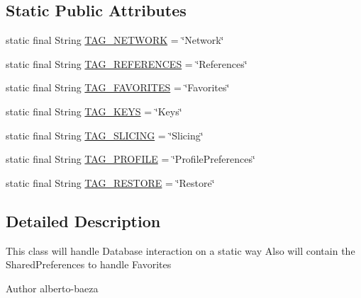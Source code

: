 \subsection*{Static Public Attributes}
\begin{DoxyCompactItemize}
\item 
static final String \hyperlink{classandroid_1_1app_1_1printerapp_1_1devices_1_1database_1_1_database_controller_ad0405374d5ebedd9bdb926c448a8109c}{T\+A\+G\+\_\+\+N\+E\+T\+W\+O\+RK} = \char`\"{}Network\char`\"{}
\item 
static final String \hyperlink{classandroid_1_1app_1_1printerapp_1_1devices_1_1database_1_1_database_controller_a6d815a2fefd8e35552ed4c3becba7a0b}{T\+A\+G\+\_\+\+R\+E\+F\+E\+R\+E\+N\+C\+ES} = \char`\"{}References\char`\"{}
\item 
static final String \hyperlink{classandroid_1_1app_1_1printerapp_1_1devices_1_1database_1_1_database_controller_a7006720e05920a2f9315c0ff0edbf1e3}{T\+A\+G\+\_\+\+F\+A\+V\+O\+R\+I\+T\+ES} = \char`\"{}Favorites\char`\"{}
\item 
static final String \hyperlink{classandroid_1_1app_1_1printerapp_1_1devices_1_1database_1_1_database_controller_ab70b3de8e36f99b623c51263de052922}{T\+A\+G\+\_\+\+K\+E\+YS} = \char`\"{}Keys\char`\"{}
\item 
static final String \hyperlink{classandroid_1_1app_1_1printerapp_1_1devices_1_1database_1_1_database_controller_a1570ed31c086f4800508f9ed839ec683}{T\+A\+G\+\_\+\+S\+L\+I\+C\+I\+NG} = \char`\"{}Slicing\char`\"{}
\item 
static final String \hyperlink{classandroid_1_1app_1_1printerapp_1_1devices_1_1database_1_1_database_controller_a18987874550e8b0ffa1e7c875e9c7bc7}{T\+A\+G\+\_\+\+P\+R\+O\+F\+I\+LE} = \char`\"{}Profile\+Preferences\char`\"{}
\item 
static final String \hyperlink{classandroid_1_1app_1_1printerapp_1_1devices_1_1database_1_1_database_controller_ac7d56e2fdccb1bce8f86039a4ef1c33b}{T\+A\+G\+\_\+\+R\+E\+S\+T\+O\+RE} = \char`\"{}Restore\char`\"{}
\end{DoxyCompactItemize}


\subsection{Detailed Description}
This class will handle Database interaction on a static way Also will contain the Shared\+Preferences to handle Favorites \begin{DoxyAuthor}{Author}
alberto-\/baeza 
\end{DoxyAuthor}


